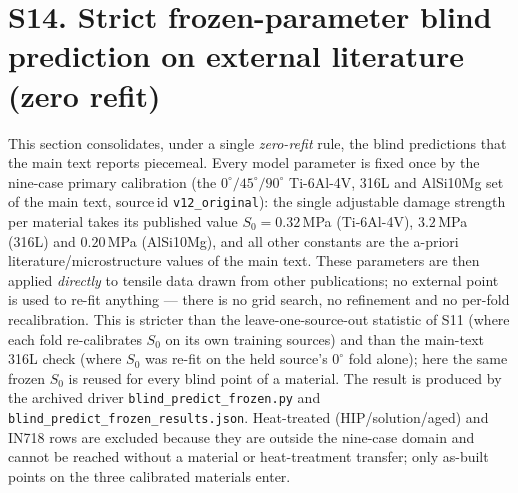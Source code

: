 \documentclass[12pt,a4paper,twocolumn]{article}
\begin{document}
\section*{S14. Strict frozen-parameter blind prediction on external literature (zero refit)}

This section consolidates, under a single \emph{zero-refit} rule, the blind predictions that the main
text reports piecemeal. Every model parameter is fixed once by the nine-case primary calibration
(the $0^\circ/45^\circ/90^\circ$ Ti-6Al-4V, 316L and AlSi10Mg set of the main text, source\,id
\texttt{v12\_original}): the single adjustable damage strength per material takes its published value
$S_0 = 0.32$\,MPa (Ti-6Al-4V), $3.2$\,MPa (316L) and $0.20$\,MPa (AlSi10Mg), and all other constants
are the a-priori literature/microstructure values of the main text. These parameters are then applied
\emph{directly} to tensile data drawn from other publications; no external point is used to re-fit
anything --- there is no grid search, no refinement and no per-fold recalibration. This is stricter than
the leave-one-source-out statistic of S11 (where each fold re-calibrates $S_0$ on its own training
sources) and than the main-text 316L check (where $S_0$ was re-fit on the held source's $0^\circ$ fold
alone); here the same frozen $S_0$ is reused for every blind point of a material. The result is produced
by the archived driver \texttt{blind\_predict\_frozen.py} and
\texttt{blind\_predict\_frozen\_results.json}. Heat-treated (HIP/solution/aged) and IN718 rows are excluded
because they are outside the nine-case domain and cannot be reached without a material or heat-treatment
transfer; only as-built points on the three calibrated materials enter.
\end{document}
